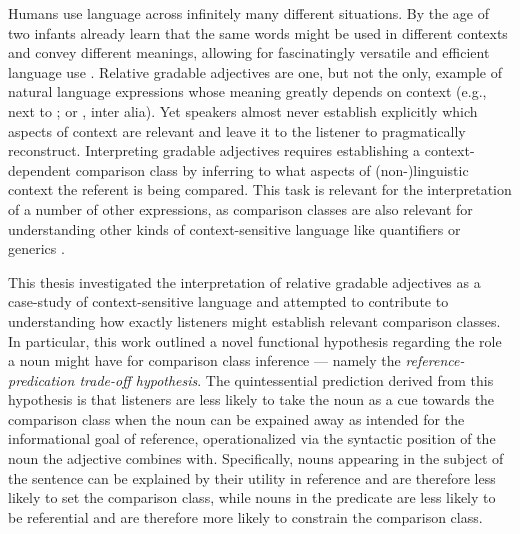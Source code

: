 Humans use language across infinitely many different situations. By the age of two infants already learn that the same words might be used in different contexts and convey different meanings, allowing for fascinatingly versatile and efficient language use \parencite{Mintz2002, ebeling1994children}. 
Relative gradable adjectives are one, but not the only, example of natural language expressions whose meaning greatly depends on context (e.g., next to \textcite[indexicals][]{braun2017}; or \textcite[anaphoras][]{goldberg2017one}, inter alia). Yet speakers almost never establish explicitly which aspects of context are relevant and leave it to the listener to pragmatically reconstruct. Interpreting gradable adjectives requires establishing a context-dependent comparison class by inferring to what aspects of (non-)linguistic context the referent is being compared. This task is relevant for the interpretation of a number of other expressions, as comparison classes are also relevant for understanding other kinds of context-sensitive language like quantifiers \parencite[e.g., "John ate \emph{many} of hot dogs",][]{scholler2017semantic} or generics \parencite[e.g., "Dogs are friendly" \emph{[relative to other animals]},][]{tessler2019language}. 

This thesis investigated the interpretation of relative gradable adjectives as a case-study of context-sensitive language and attempted to contribute to understanding how exactly listeners might establish relevant comparison classes. In particular, this work outlined a novel functional hypothesis regarding the role a noun might have for comparison class inference --- namely the \emph{reference-predication trade-off hypothesis}. The quintessential prediction derived from this hypothesis is that listeners are less likely to take the noun as a cue towards the comparison class when the noun can be expained away as intended for the informational goal of reference, operationalized via the syntactic position of the noun the adjective combines with. Specifically, nouns appearing in the subject of the sentence can be explained by their utility in reference and are therefore less likely to set the comparison class, while nouns in the predicate are less likely to be referential and are therefore more likely to constrain the comparison class.

